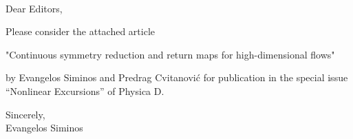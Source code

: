 \documentclass[12pt]{letter}
\begin{document}
\begin{letter}{
\\

}


\opening{Dear Editors,}

Please consider the attached article

"Continuous symmetry reduction and return maps for high-dimensional flows"

by Evangelos Siminos and Predrag Cvitanovi\'c for publication in the special
issue ``Nonlinear Excursions'' of Physica D.

\closing{Sincerely,\\ Evangelos Siminos}


\end{letter}
\end{document}

